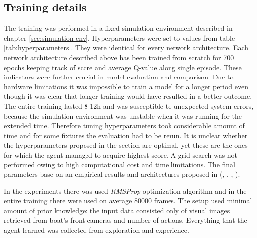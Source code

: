 \subsection{Training details}
\label{sub:training-details}

The training was performed in a fixed simulation environment described in chapter \ref{sec:simulation-env}. Hyperparameters were set to values from
table \ref{tab:hyperparameters}. They were identical for every network architecture. Each network architecture described above has been
trained from scratch for 700 epochs keeping track of score and average Q-value along single episode. These indicators were further crucial
in model evaluation and comparison. Due to hardware limitations it was impossible to train a model for a longer period even though it was
clear that longer training would have resulted in a better outcome. The entire training lasted 8-12h and was susceptible to unexpected
system errors, because the simulation environment was unstable when it was running for the extended time. Therefore tuning hyperparameters
took considerable amount of time and for some fixtures the evaluation had to be rerun. It is unclear whether the hyperparameters proposed
in the section are optimal, yet these are the ones for which the agent managed to acquire highest score. A grid search was not performed
owing to high computational cost and time limitations. The final parameters base on an empirical results and architectures proposed in
(\cite{DQNAtari}, \cite{2020DuckieTown}, \cite{DBLP:journals/corr/HasseltGS15}, \cite{DBLP:journals/corr/WangFL15}).

In the experiments there was used \emph{RMSProp} optimization algorithm and in the entire training there were used on average 80000 frames. The setup used minimal amount of prior knowledge: the input data consisted only of visual images retrieved from boat's front cameras and number of actions. Everything that the agent learned was collected from exploration and experience.